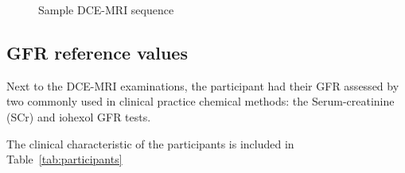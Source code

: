 \begin{figure}
			\hspace{0.005\linewidth}
		\hspace{0.005\linewidth}
	\hspace{0.005\linewidth}
\vspace{0.5cm}
\caption[Sample DCE-MRI sequence.]{Sample DCE-MRI sequence}
\label{fig:set}
\end{figure}


\subsection{GFR reference values}
Next to the DCE-MRI examinations, the participant had their GFR assessed by two commonly used in clinical practice chemical methods: the Serum-creatinine (SCr) and iohexol GFR tests.  

The clinical characteristic of the participants is included in Table~\ref{tab:participants}



